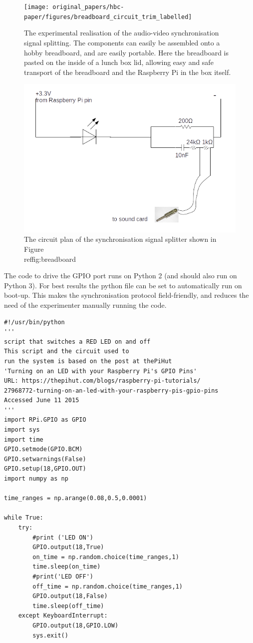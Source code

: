 \documentclass[
]{book}
\begin{document}
\begin{figure}
\texttt{[image: original\_papers/hbc-paper/figures/breadboard\_circuit\_trim\_labelled]} \caption{\label{fig:breadboard} The experimental realisation of the audio-video synchronisation signal splitting. The components can easily be assembled onto a hobby breadboard, and are easily portable. Here the breadboard is pasted on the inside of a lunch box lid, allowing easy and safe transport of the breadboard and the Raspberry Pi in the box itself.}\label{fig:breadboard}
\end{figure}

\begin{figure}
\includegraphics[width=1\linewidth]{original_papers/hbc-paper/figures/rpi_circuit} \caption{\label{fig:circuitschematic} The circuit plan of the synchronisation signal splitter shown in Figure \\ref{fig:breadboard}}\label{fig:circuitschematic}
\end{figure}

The code to drive the GPIO port runs on Python 2 (and should also run on Python 3). For best results the python file
can be set to automatically run on boot-up. This makes the synchronisation protocol field-friendly, and reduces the need
of the experimenter manually running the code.

\begin{verbatim}
#!/usr/bin/python
'''
script that switches a RED LED on and off
This script and the circuit used to
run the system is based on the post at thePiHut
'Turning on an LED with your Raspberry Pi's GPIO Pins' 
URL: https://thepihut.com/blogs/raspberry-pi-tutorials/
27968772-turning-on-an-led-with-your-raspberry-pis-gpio-pins
Accessed June 11 2015
'''
import RPi.GPIO as GPIO
import sys
import time
GPIO.setmode(GPIO.BCM)
GPIO.setwarnings(False)
GPIO.setup(18,GPIO.OUT)
import numpy as np

time_ranges = np.arange(0.08,0.5,0.0001)

while True:
    try:
        #print ('LED ON')
        GPIO.output(18,True)
        on_time = np.random.choice(time_ranges,1)
        time.sleep(on_time)
        #print('LED OFF')
        off_time = np.random.choice(time_ranges,1)
        GPIO.output(18,False)
        time.sleep(off_time)
    except KeyboardInterrupt:
        GPIO.output(18,GPIO.LOW)
        sys.exit()
\end{verbatim}
\end{document}
